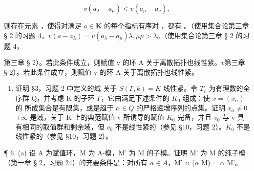 \[
v (a _ {\lambda} - a _ {\mu}) <   v (a _ {\mu} - a _ {\nu}),
\]

则存在元素 ，使得对满足 \(a \in \mathbf{K}\) 的每个指标有序对 ，都有 。（使用集合论第三章 § 2 的习题 4，\(v(a - a_{\lambda}) = v(a_{\lambda} - a_{\mu})\)\(\lambda, \mu\)\(\mu > \lambda\)。（使用集合论第三章 § 2 的习题 4，

第三章 § 2）。若此条件成立，则赋值 v 的环 A 关于离散拓扑也线性紧。\(v\)第三章 § 2）。若此条件成立，则赋值 v 的环 A 关于离散拓扑也线性紧。

\begin{enumerate}
\def\labelenumi{(\alph{enumi})}
\setcounter{enumi}{1}
\tightlist
\item
  证明 §3，习题 2 中定义的域  关于 \(S(\Gamma, k) = K\) 线性紧。令 \(T_{v}\) 为有理数的全序群 Q，并考虑 K 的子环 \(\Gamma\)，它由满足下述条件的 \(K_{0}\) 组成：使 \(x = (x_{\alpha})\) 的  所成集合是有限集，或是趋于 \(\alpha \in Q\) 的严格递增序列的点集。证明 \(x_{\alpha} \neq 0\)\(+\infty\) 是域，关于 K 上的典范赋值 v 所诱导的赋值 \(K_{0}\) 完备，并且 \(v_{0}\) 与 v 具有相同的取值群和剩余域，但 \(v_{0}\) 不是线性紧的（参见 §10，习题 2）。\(K_{0}\) 不是线性紧的（参见 §10，习题 2）。
\end{enumerate}

¶ 6. (a) 设 A 为赋值环，M 为 A-模，M' 为 M 的子模。证明 M' 为 M 的纯子模（第一章 § 2，习题 24）的充要条件是：对所有 \(\alpha \in A\)，M' ∩ (\(\alpha\) M) = \(\alpha\) M'。

